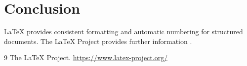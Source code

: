 \documentclass[12pt,a4paper]{article}
\begin{document}
\noindent
{}

\section{Conclusion}

LaTeX provides consistent formatting and automatic
numbering for structured documents.
The LaTeX Project provides further information
\cite{latexproject}.

\begin{thebibliography}{9}
    The LaTeX Project.
    \url{https://www.latex-project.org/}
\end{thebibliography}
\end{document}
